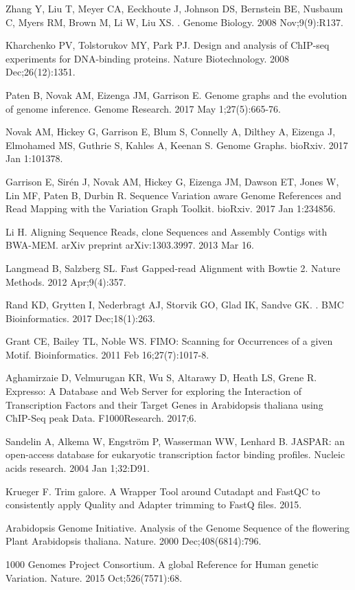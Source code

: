 \documentclass[10pt,letterpaper]{article}
\begin{document}
\begin{thebibliography}{10}


Zhang Y, Liu T, Meyer CA, Eeckhoute J, Johnson DS, Bernstein BE, Nusbaum C, Myers RM, Brown M, Li W, Liu XS. 
. 
\newblock Genome Biology. 2008 Nov;9(9):R137.

Kharchenko PV, Tolstorukov MY, Park PJ. Design and analysis of ChIP-seq experiments for DNA-binding proteins. Nature Biotechnology. 2008 Dec;26(12):1351.

Paten B, Novak AM, Eizenga JM, Garrison E. Genome graphs and the evolution of genome inference. Genome Research. 2017 May 1;27(5):665-76.

Novak AM, Hickey G, Garrison E, Blum S, Connelly A, Dilthey A, Eizenga J, Elmohamed MS, Guthrie S, Kahles A, Keenan S. Genome Graphs. bioRxiv. 2017 Jan 1:101378.


Garrison E, Sirén J, Novak AM, Hickey G, Eizenga JM, Dawson ET, Jones W, Lin MF, Paten B, Durbin R. Sequence Variation aware Genome References and Read Mapping with the Variation Graph Toolkit. bioRxiv. 2017 Jan 1:234856.


Li H. Aligning Sequence Reads, clone Sequences and Assembly Contigs with BWA-MEM. arXiv preprint arXiv:1303.3997. 2013 Mar 16.

Langmead B, Salzberg SL. Fast Gapped-read Alignment with Bowtie 2. Nature Methods. 2012 Apr;9(4):357.

Rand KD, Grytten I, Nederbragt AJ, Storvik GO, Glad IK, Sandve GK. 
. 
\newblock BMC Bioinformatics. 2017 Dec;18(1):263.

Grant CE, Bailey TL, Noble WS. FIMO: Scanning for Occurrences of a given Motif. Bioinformatics. 2011 Feb 16;27(7):1017-8.

Aghamirzaie D, Velmurugan KR, Wu S, Altarawy D, Heath LS, Grene R. Expresso: A Database and Web Server for exploring the Interaction of Transcription Factors and their Target Genes in Arabidopsis thaliana using ChIP-Seq peak Data. F1000Research. 2017;6.

Sandelin A, Alkema W, {Engström} P, Wasserman WW, Lenhard B. 
JASPAR: an open\--access database for eukaryotic transcription factor binding profiles. Nucleic acids research. 2004 Jan 1;32:D91.

Krueger F. Trim galore. A Wrapper Tool around Cutadapt and FastQC to consistently apply Quality and Adapter trimming to FastQ files. 2015.

Arabidopsis Genome Initiative. Analysis of the Genome Sequence of the flowering Plant Arabidopsis thaliana. Nature. 2000 Dec;408(6814):796.

1000 Genomes Project Consortium. A global Reference for Human genetic Variation. Nature. 2015 Oct;526(7571):68.

\end{thebibliography}
\end{document}
